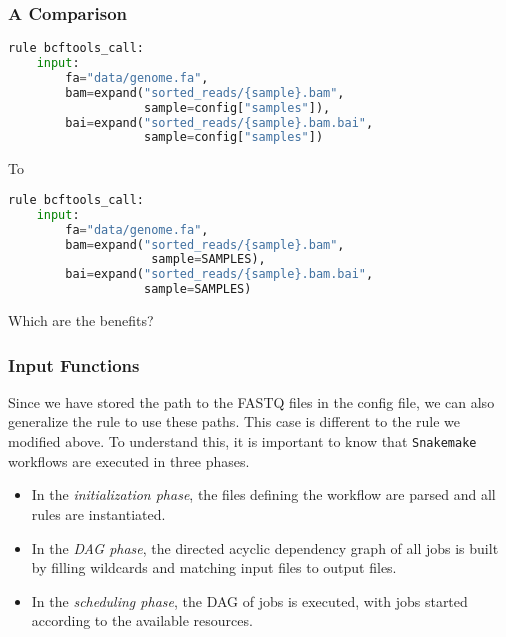 \begin{frame}[fragile]
  \frametitle{A Comparison}
  \begin{lstlisting}[language=Python,style=Python,basicstyle=\footnotesize]
rule bcftools_call:
    input:
        fa="data/genome.fa",
        bam=expand("sorted_reads/{sample}.bam",
                   sample=config["samples"]),
        bai=expand("sorted_reads/{sample}.bam.bai",
                   sample=config["samples"])
  \end{lstlisting}
  To
  \begin{lstlisting}[language=Python,style=Python,basicstyle=\footnotesize]
rule bcftools_call:
    input:
        fa="data/genome.fa",
        bam=expand("sorted_reads/{sample}.bam",
                    sample=SAMPLES),
        bai=expand("sorted_reads/{sample}.bam.bai",
                   sample=SAMPLES)
  \end{lstlisting}
  \bcquestion Which are the benefits?
\end{frame}

\begin{frame}[fragile]
  \frametitle{Input Functions}
  Since we have stored the path to the FASTQ files in the config file, we can also generalize the rule  to use these paths. This case is different to the rule  we modified above. To understand this, it is important to know that \texttt{Snakemake} workflows are executed in three phases.
  \begin{itemize}[<+->]
   \item In the \emph{initialization phase}, the files defining the workflow are parsed and all rules are instantiated.
   \item In the \emph{DAG phase}, the directed acyclic dependency graph of all jobs is built by filling wildcards and matching input files to output files.
   \item In the \emph{scheduling phase}, the DAG of jobs is executed, with jobs started according to the available resources.
  \end{itemize}
\end{frame}

